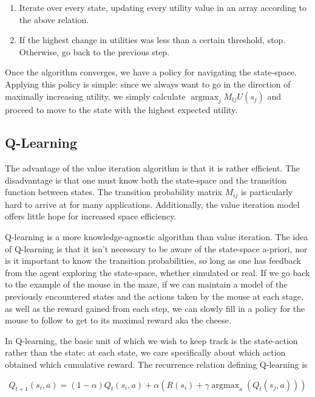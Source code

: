 \documentclass[12pt, letterpaper]{article}
\DeclareMathOperator*{\argmax}{argmax}
\begin{document}
\begin{enumerate}
    \item Iterate over every state, updating every utility value in an array according to the above relation.
    \item If the highest change in utilities was less than a certain threshold, stop. Otherwise, go back to the previous step.
\end{enumerate}

Once the algorithm converges, we have a policy for navigating the state-space. Applying this policy is simple: since we always want to go in the direction of maximally increasing utility, we simply calculate $\argmax_j M_{tj} U(s_j)$ and proceed to move to the state with the highest expected utility.


\subsection{Q-Learning}
The advantage of the value iteration algorithm is that it is rather efficient. The disadvantage is that one must know both the state-space and the transition function between states. The transition probability matrix $M_{ij}$ is particularly hard to arrive at for many applications. Additionally, the value iteration model offers little hope for increased space efficiency.

Q-learning is a more knowledge-agnostic algorithm than value iteration. The idea of Q-learning is that it isn't necessary to be aware of the state-space a-priori, nor is it important to know the transition probabilities, so long as one has feedback from the agent exploring the state-space, whether simulated or real. If we go back to the example of the mouse in the maze, if we can maintain a model of the previously encountered states and the actions taken by the mouse at each stage, as well as the reward gained from each step, we can slowly fill in a policy for the mouse to follow to get to its maximal reward aka the cheese. 

In Q-learning, the basic unit of which we wish to keep track is the state-action rather than the state: at each state, we care specifically about which action obtained which cumulative reward. The recurrence relation defining Q-learning is

\begin{equation}
    Q_{t+1}(s_i, a) = (1-\alpha) Q_t(s_i, a) + \alpha (R(s_i) + \gamma \argmax_a (Q_t(s_j, a)))
\end{equation}
\end{document}
